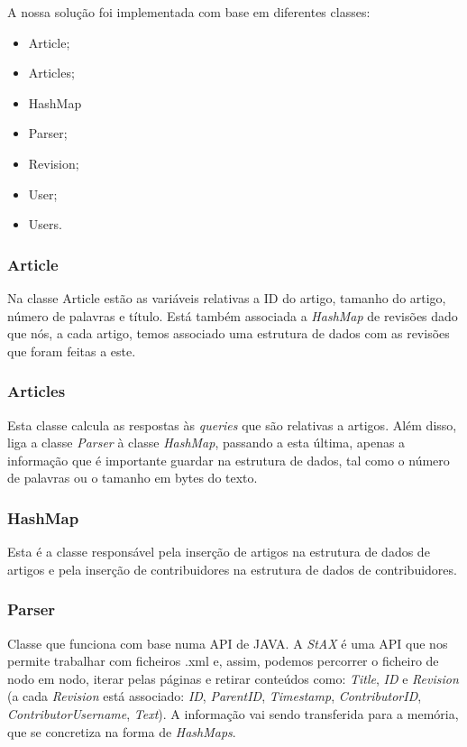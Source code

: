 \documentclass[a4paper]{article}
\begin{document}
A nossa solução foi implementada com base em diferentes classes:

\begin{itemize}
    \item Article;
    \item Articles;
    \item HashMap
    \item Parser;
    \item Revision;
    \item User;
    \item Users.
\end{itemize}
\label{sec:solucao}

\subsubsection{Article}
Na classe Article estão as variáveis relativas a ID do artigo, tamanho do artigo, número de palavras e título. Está também associada a \textit{HashMap} de revisões dado que nós, a cada artigo, temos associado uma estrutura de dados com as revisões que foram feitas a este.

\subsubsection{Articles}
Esta classe calcula as respostas às \textit{queries} que são relativas a artigos. Além disso, liga a classe \textit{Parser} à classe \textit{\textit{HashMap}}, passando a esta última, apenas a informação que é importante guardar na estrutura de dados, tal como o número de palavras ou o tamanho em bytes do texto.
 
\subsubsection{HashMap}
Esta é a classe responsável pela inserção de artigos na estrutura de dados de artigos e pela inserção de contribuidores na estrutura de dados de contribuidores.

\subsubsection{Parser}
Classe que funciona com base numa API de JAVA. A \textit{StAX} é uma API que nos permite trabalhar com ficheiros .xml e, assim, podemos percorrer o ficheiro de nodo em nodo, iterar pelas páginas e retirar conteúdos como: \textit{Title}, \textit{ID} e \textit{Revision} (a cada \textit{Revision} está associado: \textit{ID}, \textit{ParentID}, \textit{Timestamp}, \textit{ContributorID}, \textit{ContributorUsername}, \textit{Text}).
A informação vai sendo transferida para a memória, que se concretiza na forma de \textit{\textit{HashMap}s}.
\end{document}
